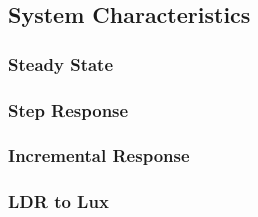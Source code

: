 \subsection{System Characteristics}
\label{sec:SystemCharacteristics}

\subsubsection{Steady State}
\label{sub:SteadyState}

\subsubsection{Step Response}
\label{sub:StepResponse}

\subsubsection{Incremental Response}
\label{sub:IncrementalResponse}

\subsubsection{LDR to Lux}
\label{sub:LDRtoLux}
